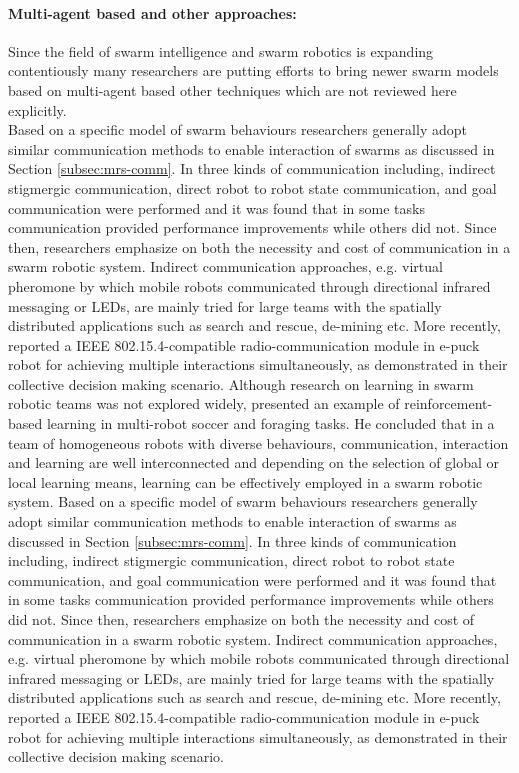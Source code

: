 \paragraph*{Multi-agent based and other approaches:}
Since the field of swarm intelligence and swarm robotics is expanding contentiously many researchers are putting efforts to bring newer swarm models based on multi-agent based other techniques which are not reviewed here explicitly.\\
%
Based on a specific model of swarm behaviours researchers generally adopt similar communication methods to enable interaction of swarms as discussed in Section \ref{subsec:mrs-comm}. In \cite{Balch2005} three kinds of communication including, indirect stigmergic communication, direct robot to robot state communication, and goal communication were performed and it was found that in some tasks communication provided performance improvements while others did not. Since then, researchers emphasize on both the necessity and cost of communication in a swarm robotic system. Indirect communication approaches, e.g. virtual pheromone \cite{Payton+2005,Hamann+2006} by which mobile robots communicated through directional infrared messaging or LEDs, are mainly tried for large teams with the spatially distributed applications such as search and rescue, de-mining etc. More recently, \cite{Cianci2007} reported a IEEE 802.15.4-compatible radio-communication module in e-puck robot for achieving multiple interactions simultaneously, as demonstrated in their collective decision making scenario. 
Although research on learning in swarm robotic teams was not explored widely, \cite{Balch2005} presented an example of reinforcement-based learning in multi-robot soccer and foraging tasks. He concluded that in a team of homogeneous robots with diverse behaviours, communication, interaction and learning are well interconnected and depending on the selection of global or local learning means, learning can be effectively employed in a swarm robotic system.
Based on a specific model of swarm behaviours researchers generally adopt similar communication methods to enable interaction of swarms as discussed in Section \ref{subsec:mrs-comm}. In \cite{Balch2005} three kinds of communication including, indirect stigmergic communication, direct robot to robot state communication, and goal communication were performed and it was found that in some tasks communication provided performance improvements while others did not. Since then, researchers emphasize on both the necessity and cost of communication in a swarm robotic system. Indirect communication approaches, e.g. virtual pheromone \cite{Payton+2005,Hamann+2006} by which mobile robots communicated through directional infrared messaging or LEDs, are mainly tried for large teams with the spatially distributed applications such as search and rescue, de-mining etc. More recently, \cite{Cianci2007} reported a IEEE 802.15.4-compatible radio-communication module in e-puck robot for achieving multiple interactions simultaneously, as demonstrated in their collective decision making scenario. 
